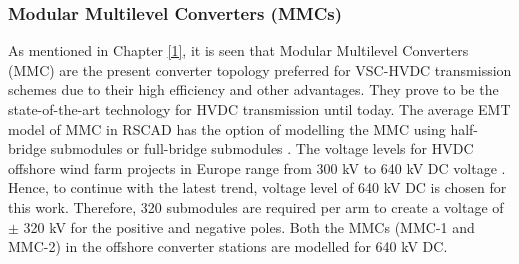 \subsubsection{Modular Multilevel Converters (MMCs)}
As mentioned in Chapter \ref{1}, it is seen that Modular Multilevel Converters (\gls{MMC}) are the present converter topology preferred for \gls{VSC}-\gls{HVDC} transmission schemes due to their high efficiency and other advantages. They prove to be the state-of-the-art technology for \gls{HVDC} transmission until today. The average \gls{EMT} model of \gls{MMC} in
RSCAD has the option of modelling the \gls{MMC} using half-bridge submodules or full-bridge submodules \cite{noauthor_mmc_nodate_1}. 
The voltage levels for \gls{HVDC} offshore wind farm projects in Europe range from 300 kV to 640 kV \gls{DC} voltage \cite{ryndzionek_evolution_2020}. Hence, to continue with the latest trend, voltage level of 640 kV \gls{DC} is chosen for this work. Therefore, 320 submodules are required per arm to create a voltage of $\pm$ 320 kV for the positive and negative poles. Both the \gls{MMC}s (\gls{MMC}-1 and \gls{MMC}-2) in the offshore converter stations are modelled for 640 kV \gls{DC}.  

